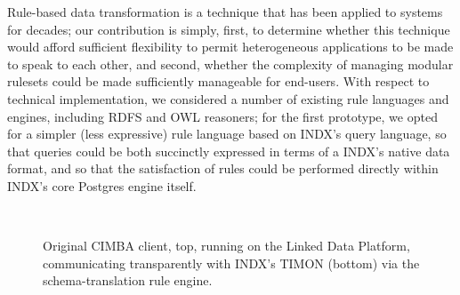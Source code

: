 \documentclass{sig-alternate}
\begin{document}
Rule-based data transformation is a technique that has been applied to systems for decades; our contribution is simply, first, to determine whether this technique would afford sufficient flexibility to permit heterogeneous applications to be made to speak to each other, and second, whether the complexity of managing modular rulesets could be made sufficiently manageable for end-users.   With respect to technical implementation, we considered a number of existing rule languages and engines, including RDFS and OWL reasoners; for the first prototype, we opted for a simpler (less expressive) rule language based on INDX's query language, so that queries could be both succinctly expressed in terms of a INDX's native data format, and so that the satisfaction of rules could be performed directly within INDX's core Postgres engine itself.

\begin{figure}[t!]
 	  \begin{center}
        \\
    \end{center}
    \caption{%
        Original CIMBA client, top, running on the Linked Data Platform, communicating transparently with INDX's TIMON (bottom) via the schema-translation rule engine.
    }%
  \label{fig:timon}
\end{figure}
\end{document}
